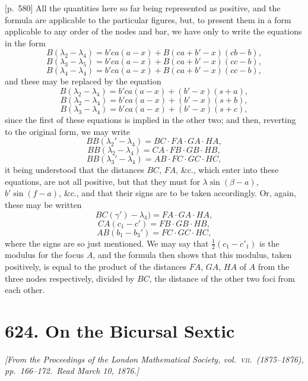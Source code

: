 \documentclass[11pt,a4paper]{article}
\theoremstyle{plain}
\theoremstyle{definition}
\theoremstyle{remark}
\begin{document}
[p.~580] All the quantities here so far being represented as positive, and the formula are applicable to the particular figures, but, to present them in a form applicable to any order of the nodes and bar, we have only to write the equations in the form
\[
B(\lambda_2 - \lambda_4) = b' c a (a - x) + B(c a + b' - x)(c b - b),
\]
\[
B(\lambda_3 - \lambda_5) = b' c a (a - x) + B(c a + b' - x)(c c - b),
\]
\[
B(\lambda_4 - \lambda_4) = b' c a (a - x) + B(c a + b' - x)(c c - b),
\]
and these may be replaced by the equation
\[
B(\lambda_2 - \lambda_4) = b' c a (a - x) + (b' - x)(s + a),
\]
\[
B(\lambda_2 - \lambda_4) = b' c a (a - x) + (b' - x)(s + b),
\]
\[
B(\lambda_3 - \lambda_4) = b' c a (a - x) + (b' - x)(s + c),
\]
since the first of these equations is implied in the other two; and then, reverting to the original form, we may write
\[
BB(\lambda_2' - \lambda_4) = BC \cdot FA \cdot GA \cdot HA,
\]
\[
BB(\lambda_2 - \lambda_4) = CA \cdot FB \cdot GB \cdot HB,
\]
\[
BB(\lambda_3' - \lambda_4) = AB \cdot FC \cdot GC \cdot HC,
\]
it being understood that the distances $BC$, $FA$, \&c., which enter into these equations, are not all positive, but that they must for $\lambda \sin (\beta - a)$, $b' \sin (f - a)$, \&c., and that their signs are to be taken accordingly. Or, again, these may be written
\[
BC(\gamma') - \lambda_4) = FA \cdot GA \cdot HA,
\]
\[
CA(c_1 - c') = FB \cdot GB \cdot HB,
\]
\[
AB(b_1 - b_3') = FC \cdot GC \cdot HC,
\]
where the signs are so just mentioned. We may say that $\frac{1}{2}(c_1 - c'_1)$ is the modulus for the focus $A$, and the formula then shows that this modulus, taken positively, is equal to the product of the distances $FA$, $GA$, $HA$ of $A$ from the three nodes respectively, divided by $BC$, the distance of the other two foci from each other.

\bigskip

\newpage
\section*{\textbf{624.} On the Bicursal Sextic}

\textit{[From the Proceedings of the London Mathematical Society, vol.\ \textsc{vii}.\ (1875--1876), pp.~166--172.\ Read March 10, 1876.]}
\end{document}
